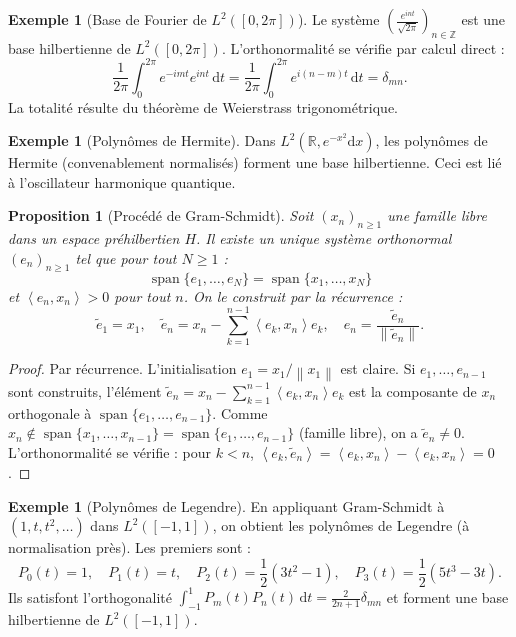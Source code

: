 \documentclass[a4paper,12pt]{book}
\DeclareMathOperator{\spn}{span}
\newcommand{\Z}{\mathbb{Z}}
\newcommand{\R}{\mathbb{R}}
\newcommand{\dd}{\mathrm{d}}
\newcommand{\norm}[1]{\left\| #1 \right\|}
\newcommand{\inner}[2]{\left\langle #1, #2 \right\rangle}
\theoremstyle{definition}
\newtheorem{exemple}[definition]{Exemple}
\theoremstyle{plain}
\newtheorem{proposition}[definition]{Proposition}
\theoremstyle{remark}
\begin{document}
\begin{exemple}[{Base de Fourier de $L^2([0, 2\pi])$}]\label{ex:base-fourier}
Le système $\left(\frac{e^{int}}{\sqrt{2\pi}}\right)_{n \in \Z}$ est une base hilbertienne de $L^2([0, 2\pi])$. L'orthonormalité se vérifie par calcul direct :
\[
    \frac{1}{2\pi}\int_0^{2\pi} e^{-imt}e^{int}\,\dd t = \frac{1}{2\pi}\int_0^{2\pi}e^{i(n-m)t}\,\dd t = \delta_{mn}.
\]
La totalité résulte du théorème de Weierstrass trigonométrique.
\end{exemple}

\begin{exemple}[Polynômes de Hermite]\label{ex:hermite}
Dans $L^2(\R, e^{-x^2}\dd x)$, les polynômes de Hermite (convenablement normalisés) forment une base hilbertienne. Ceci est lié à l'oscillateur harmonique quantique.
\end{exemple}

\begin{proposition}[Procédé de Gram-Schmidt]\label{prop:gram-schmidt}
Soit $(x_n)_{n \geq 1}$ une famille libre dans un espace préhilbertien $H$. Il existe un unique système orthonormal $(e_n)_{n\geq 1}$ tel que pour tout $N \geq 1$ :
\[
    \spn\{e_1, \ldots, e_N\} = \spn\{x_1, \ldots, x_N\}
\]
et $\inner{e_n}{x_n} > 0$ pour tout $n$. On le construit par la récurrence :
\[
    \tilde{e}_1 = x_1, \quad \tilde{e}_n = x_n - \sum_{k=1}^{n-1}\inner{e_k}{x_n}e_k, \quad e_n = \frac{\tilde{e}_n}{\norm{\tilde{e}_n}}.
\]
\end{proposition}

\begin{proof}
Par récurrence. L'initialisation $e_1 = x_1/\norm{x_1}$ est claire. Si $e_1, \ldots, e_{n-1}$ sont construits, l'élément $\tilde{e}_n = x_n - \sum_{k=1}^{n-1}\inner{e_k}{x_n}e_k$ est la composante de $x_n$ orthogonale à $\spn\{e_1, \ldots, e_{n-1}\}$. Comme $x_n \notin \spn\{x_1, \ldots, x_{n-1}\} = \spn\{e_1, \ldots, e_{n-1}\}$ (famille libre), on a $\tilde{e}_n \neq 0$. L'orthonormalité se vérifie : pour $k < n$, $\inner{e_k}{\tilde{e}_n} = \inner{e_k}{x_n} - \inner{e_k}{x_n} = 0$.
\end{proof}

\begin{exemple}[Polynômes de Legendre]\label{ex:legendre}
En appliquant Gram-Schmidt à $(1, t, t^2, \ldots)$ dans $L^2([-1,1])$, on obtient les polynômes de Legendre (à normalisation près). Les premiers sont :
\[
    P_0(t) = 1, \quad P_1(t) = t, \quad P_2(t) = \frac{1}{2}(3t^2 - 1), \quad P_3(t) = \frac{1}{2}(5t^3 - 3t).
\]
Ils satisfont l'orthogonalité $\int_{-1}^1 P_m(t)P_n(t)\,\dd t = \frac{2}{2n+1}\delta_{mn}$ et forment une base hilbertienne de $L^2([-1,1])$.
\end{exemple}
\end{document}
